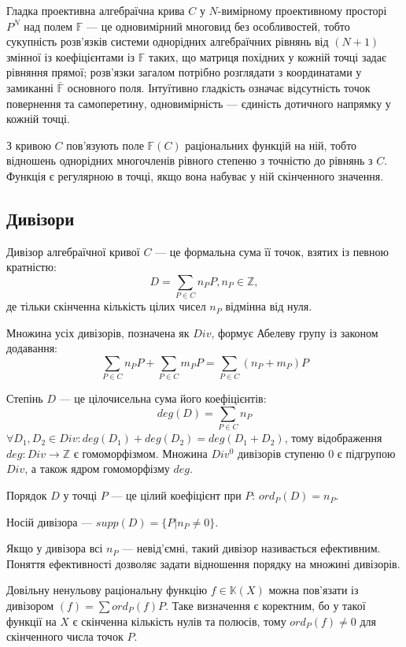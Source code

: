 \documentclass[a4paper,14pt,oneside]{extarticle}
\begin{document}
Гладка проективна алгебраїчна крива $C$ у $N$-вимірному проективному просторі $P^N$ над полем $\mathbb{F}$ --- 
це одновимірний многовид без особливостей, тобто сукупність розв'язків системи однорідних алгебраїчних рівнянь від
$(N+1)$ змінної із коефіцієнтами із $\mathbb{F}$ таких, що матриця похідних у кожній точці задає рівняння прямої; 
розв'язки загалом потрібно розглядати з координатами у замиканні $\bar{\mathbb{F}}$ основного поля.
Інтуїтивно гладкість означає відсутність точок повернення та самоперетину, одновимірність --- єдиність 
дотичного напрямку у кожній точці.

З кривою $C$ пов'язують поле $\mathbb{F}(C)$ раціональних функцій на ній, тобто відношень однорідних многочленів 
рівного степеню з точністю до рівнянь з $C$. Функція є регулярною в точці, якщо вона набуває у ній скінченного значення.



\subsection{Дивізори}
Дивізор алгебраїчної кривої $C$ --- це формальна сума її точок, взятих із певною кратністю:
$$D = \sum_{P \in C} n_P P, n_P \in \mathbb{Z},$$
де тільки скінченна кількість цілих чисел $n_P$ відмінна від нуля.

Множина усіх дивізорів, позначена як $Div$, формує Абелеву групу із законом додавання:
$$
\sum_{P \in C} n_P P + \sum_{P \in C} m_P P = \sum_{P \in C} (n_P + m_P) P
$$

Степінь $D$ --- це цілочисельна сума його коефіцієнтів:
$$deg(D) = \sum_{P \in C} n_P$$
$\forall D_1, D_2 \in Div: deg(D_1) + deg(D_2) = deg(D_1 + D_2)$, тому відображення $deg: Div \to \mathbb{Z}$ є гомоморфізмом.
Множина $Div^0$ дивізорів ступеню 0 є підгрупою $Div$, а також ядром гомоморфізму $deg$.

Порядок $D$ у точці $P$ --- це цілий коефіцієнт при $P$: $ord_P(D) = n_P$.

Носій дивізора --- $supp(D) = \{ P | n_P \neq 0 \}$.

Якщо у дивізора всі $n_P$ --- невід'ємні, такий дивізор називається ефективним. Поняття ефективності дозволяє задати відношення порядку на множині дивізорів. 

Довільну ненульову раціональну функцію $f \in \mathbb{K}(X)$ можна пов'язати із дивізором $(f) = \sum ord_P(f)P$. 
Таке визначення є коректним, бо у такої функції на $X$ є скінченна кількість нулів та полюсів, тому $ord_P(f) \neq 0$ для скінченного числа точок $P$.
\end{document}

